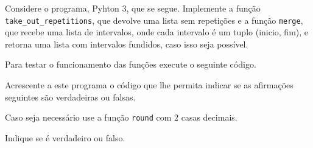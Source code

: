\documentclass[12pt,varwidth=16cm,border=1pt]{standalone}
\begin{document}
Considere o programa, Pyhton 3, que se segue. Implemente a função \verb+take_out_repetitions+, que devolve uma lista sem repetições e a função \verb+merge+, que recebe uma lista de intervalos, onde cada intervalo é um tuplo (inicio, fim), e retorna uma lista com intervalos fundidos, caso isso seja possível.



Para testar o funcionamento das funções execute o seguinte código.




Acrescente a este programa o código que lhe permita indicar se as
afirmações seguintes são verdadeiras ou falsas.

Caso seja necessário use a função \verb+round+ com 2 casas decimais.

Indique se é verdadeiro ou falso.
\end{document}
